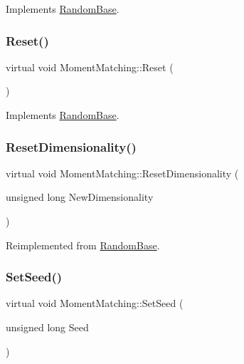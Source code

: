 Implements \hyperlink{classRandomBase_aa061fb77f53969f6fbe40c7454c69eb9}{Random\+Base}.

\hypertarget{classMomentMatching_ac1c10b8bc2fc4b8b1564af89725c27ca}{}\label{classMomentMatching_ac1c10b8bc2fc4b8b1564af89725c27ca} 
\subsubsection{\texorpdfstring{Reset()}{Reset()}}
{\footnotesize\ttfamily virtual void Moment\+Matching\+::\+Reset (\begin{DoxyParamCaption}{ }\end{DoxyParamCaption})\hspace{0.3cm}{\ttfamily [virtual]}}



Implements \hyperlink{classRandomBase_a6e35c1467b37fc8c5e262297223685eb}{Random\+Base}.

\hypertarget{classMomentMatching_abf820b373aed3833b07408c53862f69b}{}\label{classMomentMatching_abf820b373aed3833b07408c53862f69b} 
\subsubsection{\texorpdfstring{Reset\+Dimensionality()}{ResetDimensionality()}}
{\footnotesize\ttfamily virtual void Moment\+Matching\+::\+Reset\+Dimensionality (\begin{DoxyParamCaption}\item[{unsigned long}]{New\+Dimensionality }\end{DoxyParamCaption})\hspace{0.3cm}{\ttfamily [virtual]}}



Reimplemented from \hyperlink{classRandomBase_a8931e429ae130ea44af5469dc6ae728f}{Random\+Base}.

\hypertarget{classMomentMatching_a3700491fdae597126aab18fb5f42de04}{}\label{classMomentMatching_a3700491fdae597126aab18fb5f42de04} 
\subsubsection{\texorpdfstring{Set\+Seed()}{SetSeed()}}
{\footnotesize\ttfamily virtual void Moment\+Matching\+::\+Set\+Seed (\begin{DoxyParamCaption}\item[{unsigned long}]{Seed }\end{DoxyParamCaption})\hspace{0.3cm}{\ttfamily [virtual]}}



